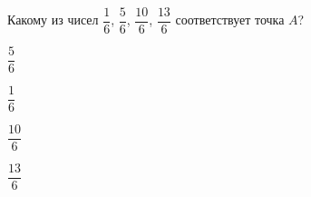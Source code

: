 \begin{ex}
	Какому из чисел $\dfrac{1}{6}$, $\dfrac{5}{6}$, $\dfrac{10}{6}$, $\dfrac{13}{6}$ соответствует точка $A$?
	
	\selectanswer
	\begin{enumcols}[columns=4]
		\item $\dfrac{5}{6}$
		\item $\dfrac{1}{6}$
		\item $\dfrac{10}{6}$
		\item $\dfrac{13}{6}$
	\end{enumcols}
\end{ex}